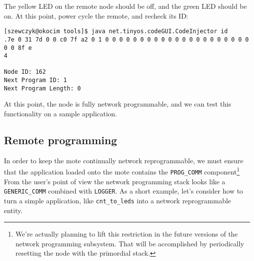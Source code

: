 \documentclass[12pt,fullpage]{article}
\newcommand{\component}[1]{{\tt #1}}
\newcommand{\application}[1]{{\tt #1}}
\begin{document}
\begin{itemize}
The yellow LED on the remote node should be off, and the green LED should be
on. At this point, power cycle the remote, and recheck its ID:

\begin{small}
\begin{verbatim}
[szewczyk@okocim tools]$ java net.tinyos.codeGUI.CodeInjector id
.7e 0 31 7d 0 0 c0 7f a2 0 1 0 0 0 0 0 0 0 0 0 0 0 0 0 0 0 0 0 0 0 0 0 0 0 8f e
4

Node ID: 162
Next Program ID: 1
Next Program Length: 0
\end{verbatim}
\end{small}
\end{itemize}

At this point, the node is fully network programmable, and we can test this
functionality on a sample application.

\subsection*{Remote programming}

In order to keep the mote continually network reprogrammable, we must ensure
that the application loaded onto the mote contains the \component{PROG\_COMM}
component\footnote{We're actually planning to lift this restriction in the
future versions of the network programming subsystem. That will be accomplished
by periodically resetting the node with the primordial stack.}  From the
user's point of view the network programming stack looks like a
\component{GENERIC\_COMM} combined with \component{LOGGER}.  As a short
example, let's consider how to turn a simple application, like
\application{cnt\_to\_leds} into a network reprogrammable entity. 
\end{document}
